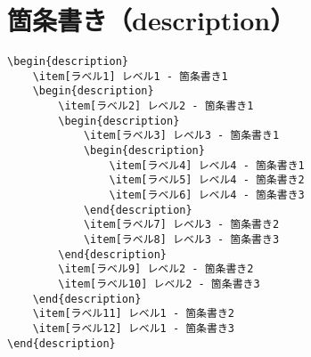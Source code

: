 \section{箇条書き（description）}

\begin{verbatim}
\begin{description}
    \item[ラベル1] レベル1 - 箇条書き1
    \begin{description}
        \item[ラベル2] レベル2 - 箇条書き1
        \begin{description}
            \item[ラベル3] レベル3 - 箇条書き1
            \begin{description}
                \item[ラベル4] レベル4 - 箇条書き1
                \item[ラベル5] レベル4 - 箇条書き2
                \item[ラベル6] レベル4 - 箇条書き3
            \end{description}
            \item[ラベル7] レベル3 - 箇条書き2
            \item[ラベル8] レベル3 - 箇条書き3
        \end{description}
        \item[ラベル9] レベル2 - 箇条書き2
        \item[ラベル10] レベル2 - 箇条書き3
    \end{description}
    \item[ラベル11] レベル1 - 箇条書き2
    \item[ラベル12] レベル1 - 箇条書き3
\end{description}
\end{verbatim}


